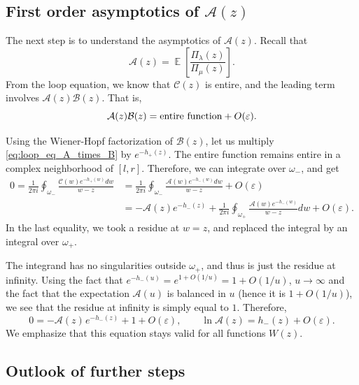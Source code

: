 \documentclass[letterpaper,11pt,oneside,reqno]{article}
\numberwithin{equation}{section}
\newcommand{\ssp}{\hspace{1pt}}
\theoremstyle{definition}
\begin{document}
\subsection{First order asymptotics of $\mathcal{A}(z)$}

The next step is to understand the asymptotics of $\mathcal{A}(z)$. Recall that 
\begin{equation}
	\label{eq:A_definition}
	\mathcal{A}(z)=\operatorname{\mathbb{E}}\left[ \frac{\Pi_\lambda(z)}{\Pi_\mu(z)} \right].
\end{equation}
From the loop equation, we know that $\mathcal{C}(z)$ is entire, and the leading term involves $\mathcal{A}(z)\mathcal{B}(z)$. That is,
\begin{equation}
	\label{eq:loop_eq_A_times_B}
	\mathcal{A}(z)\mathcal{B}(z) = \textnormal{entire function} + O(\varepsilon).
\end{equation}

Using the Wiener-Hopf factorization of $\mathcal{B}(z)$, let
us multiply \eqref{eq:loop_eq_A_times_B}
by $e^{-h_+(z)}$. The entire function remains entire in a complex
neighborhood of $[l,r]$. Therefore, we can integrate over $\omega_-$, and get
\begin{align*}
	0=
	\frac{1}{2\pi i}\oint_{\omega_-}\frac{\mathcal{C}(w)e^{-h_+(w)}dw}{w-z}
	&=
	\frac{1}{2\pi i}\oint_{\omega_-}\frac{\mathcal{A}(w)e^{-h_-(w)}dw}{w-z}+O(\varepsilon)
	\\&=
	-\mathcal{A}(z)e^{-h_-(z)}+\frac{1}{2\pi i}\oint_{\omega_+}
	\frac{\mathcal{A}(w)e^{-h_-(w)}}{w-z}dw+O(\varepsilon).
\end{align*}
In the last equality, we took a residue at $w=z$, and replaced the integral
by an integral over $\omega_+$.

The integrand has no singularities outside $\omega_+$, and thus is just the residue at 
infinity.
Using the fact that 
$e^{-h_-(u)}=e^{1+O(1/u)}=1+O(1/u)$, $u\to\infty$
and the fact that the expectation $\mathcal{A}(u)$ is balanced in $u$
(hence it is $1+O(1/u)$), 
we see that 
the residue at infinity is simply equal to $1$.
Therefore, 
\begin{equation*}
	0=-\mathcal{A}(z)\ssp e^{-h_-(z)}+1+O(\varepsilon),\qquad 
	\ln \mathcal{A}(z)=h_-(z)+O(\varepsilon).
\end{equation*}
We emphasize that this equation stays valid for all functions $W(z)$.

\subsection{Outlook of further steps}
\end{document}
